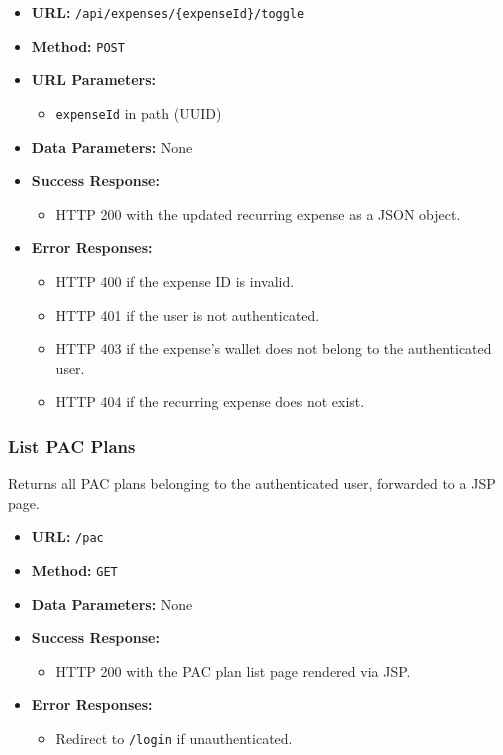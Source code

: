 \begin{itemize}
    \item \textbf{URL:} \texttt{/api/expenses/\{expenseId\}/toggle}
    \item \textbf{Method:} \texttt{POST}
    \item \textbf{URL Parameters:}
    \begin{itemize}
        \item \texttt{expenseId} in path (UUID)
    \end{itemize}
    \item \textbf{Data Parameters:} None
    \item \textbf{Success Response:}
    \begin{itemize}
        \item HTTP 200 with the updated recurring expense as a JSON object.
    \end{itemize}
    \item \textbf{Error Responses:}
    \begin{itemize}
        \item HTTP 400 if the expense ID is invalid.
        \item HTTP 401 if the user is not authenticated.
        \item HTTP 403 if the expense's wallet does not belong to the authenticated user.
        \item HTTP 404 if the recurring expense does not exist.
    \end{itemize}
\end{itemize}


\subsubsection{List PAC Plans}

Returns all PAC plans belonging to the authenticated user, forwarded to a JSP page.

\begin{itemize}
    \item \textbf{URL:} \texttt{/pac}
    \item \textbf{Method:} \texttt{GET}
    \item \textbf{Data Parameters:} None
    \item \textbf{Success Response:}
    \begin{itemize}
        \item HTTP 200 with the PAC plan list page rendered via JSP.
    \end{itemize}
    \item \textbf{Error Responses:}
    \begin{itemize}
        \item Redirect to \texttt{/login} if unauthenticated.
    \end{itemize}
\end{itemize}

